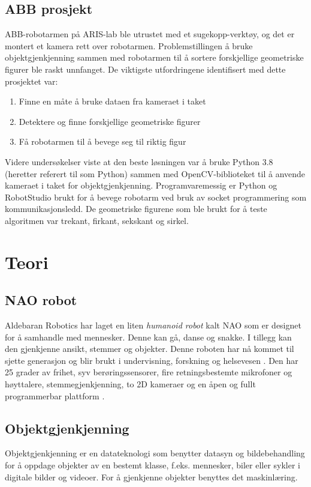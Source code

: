 \documentclass[conference]{IEEEtran}
\begin{document}
    \subsection{ABB prosjekt}
        ABB-robotarmen på ARIS-lab ble utrustet med et sugekopp-verktøy, og det er montert et kamera rett over robotarmen. Problemstillingen å bruke 
        objektgjenkjenning sammen med robotarmen til å sortere forskjellige geometriske figurer ble raskt unnfanget. De viktigste utfordringene identifisert 
        med dette prosjektet var:
        \begin{enumerate}
            \item Finne en måte å bruke dataen fra kameraet i taket
            \item Detektere og finne forskjellige geometriske figurer
            \item Få robotarmen til å bevege seg til riktig figur
        \end{enumerate}
        Videre undersøkelser viste at den beste løsningen var å bruke Python 3.8 (heretter referert til som Python) sammen med OpenCV-biblioteket til å 
        anvende kameraet i taket for objektgjenkjenning. Programvaremessig er Python og RobotStudio brukt for å bevege robotarm ved bruk av socket programmering 
        som kommunikasjonsledd. De geometriske figurene som ble brukt for å teste algoritmen var trekant, firkant, sekskant og sirkel.

\section{Teori}

    \subsection{NAO robot}
        Aldebaran Robotics har laget en liten \textit{humanoid robot} kalt NAO som er designet for å samhandle med mennesker. Denne kan gå, danse og snakke. I tillegg 
        kan den gjenkjenne ansikt, stemmer og objekter. Denne roboten har nå kommet til sjette generasjon og blir brukt i undervisning, forskning og helsevesen \cite{teori:NAO}. 
        Den har 25 grader av frihet, syv berøringssensorer, fire retningsbestemte mikrofoner og høyttalere, stemmegjenkjenning, to 2D kameraer og en åpen 
        og fullt programmerbar plattform \cite{teori:SBNAO}.

    \subsection{Objektgjenkjenning}
        Objektgjenkjenning er en datateknologi som benytter datasyn og bildebehandling for å oppdage objekter av en bestemt klasse, f.eks. mennesker, biler eller sykler i digitale bilder og videoer. For å gjenkjenne objekter benyttes det maskinlæring. 
\end{document}
